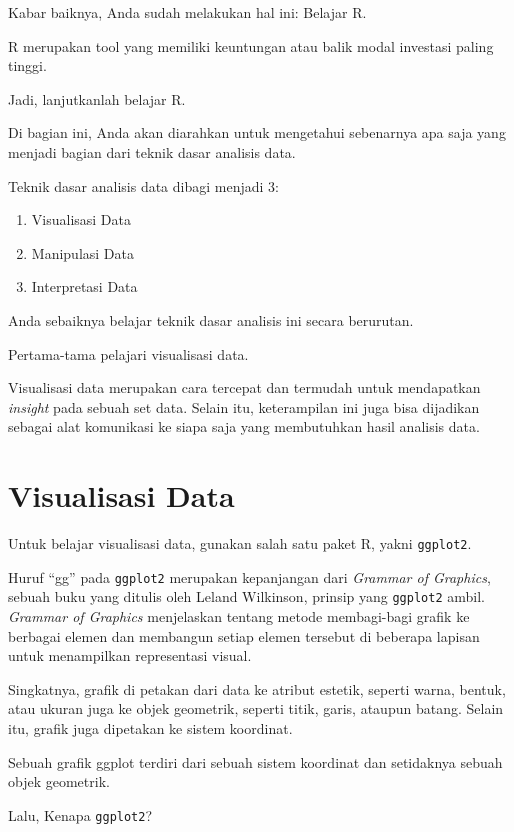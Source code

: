 \documentclass[openany]{book}
\providecommand{\tightlist}{%
  \setlength{\itemsep}{0pt}\setlength{\parskip}{0pt}}
\begin{document}
Kabar baiknya, Anda sudah melakukan hal ini: Belajar R.

R merupakan tool yang memiliki keuntungan atau balik modal investasi
paling tinggi.

Jadi, lanjutkanlah belajar R.

Di bagian ini, Anda akan diarahkan untuk mengetahui sebenarnya apa saja
yang menjadi bagian dari teknik dasar analisis data.

Teknik dasar analisis data dibagi menjadi 3:

\begin{enumerate}
\def\labelenumi{\arabic{enumi}.}
\tightlist
\item
  Visualisasi Data
\item
  Manipulasi Data
\item
  Interpretasi Data
\end{enumerate}

Anda sebaiknya belajar teknik dasar analisis ini secara berurutan.

Pertama-tama pelajari visualisasi data.

Visualisasi data merupakan cara tercepat dan termudah untuk mendapatkan
\emph{insight} pada sebuah set data. Selain itu, keterampilan ini juga
bisa dijadikan sebagai alat komunikasi ke siapa saja yang membutuhkan
hasil analisis data.

\section{Visualisasi Data}\label{visualisasi-data}

Untuk belajar visualisasi data, gunakan salah satu paket R, yakni
\texttt{ggplot2}.

Huruf ``gg'' pada \texttt{ggplot2} merupakan kepanjangan dari
\emph{Grammar of Graphics}, sebuah buku yang ditulis oleh Leland
Wilkinson, prinsip yang \texttt{ggplot2} ambil. \emph{Grammar of
Graphics} menjelaskan tentang metode membagi-bagi grafik ke berbagai
elemen dan membangun setiap elemen tersebut di beberapa lapisan untuk
menampilkan representasi visual.

Singkatnya, grafik di petakan dari data ke atribut estetik, seperti
warna, bentuk, atau ukuran juga ke objek geometrik, seperti titik,
garis, ataupun batang. Selain itu, grafik juga dipetakan ke sistem
koordinat.

Sebuah grafik ggplot terdiri dari sebuah sistem koordinat dan setidaknya
sebuah objek geometrik.

Lalu, Kenapa \texttt{ggplot2}?
\end{document}

